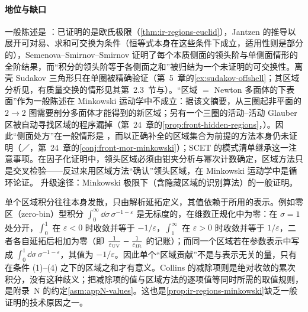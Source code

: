 \paragraph{地位与缺口}
一般陈述是 \tagP：已证明的是欧氏极限（\cref{thm:ir-regions-euclid}），Jantzen 的推导以展开可对易、求和可交换为条件（恒等式本身在这些条件下成立，适用性则是部分的）\cite{Jantzen2011}，Semenova--Smirnov--Smirnov 证明了每个本质侧面的领头阶与单侧面情形的全阶结果\cite{Semenova:2018cwy}，而“积分的领头阶等于各侧面之和”被归结为一个未证明的可交换性。离壳 Sudakov 三角形只在单圈被精确验证（第~5~章的\cref{ex:sudakov-offshell}；其区域分析见\cite[第~2.2~节]{BecherBroggioFerroglia2015}，有质量交换的情形见其第~2.3~节与\cite[第~6~节]{Jantzen2011}）。“区域 $=$ Newton 多面体的下表面”作为一般陈述在 Minkowski 运动学中不成立：据该文摘要，从三圈起非平面的 $2\to2$ 图需要剖分多面体才能得到的新区域\cite{Gardi:2024axt}；另有一个三圈的活动--活动 Glauber 区被自动寻找区域的程序漏掉\cite{Becher:2024kmk}（第~24~章的\cref{prop:front-hidden-regions}，\tagV）。因此“侧面处方”在一般情形是 \tagV，而以正确补全的区域集合为前提的方法本身仍未证明（\tagP／\tagC，第~24~章的\cref{conj:front-mor-minkowski}）；SCET 的模式清单继承这一注意事项。在因子化证明中，领头区域必须由钳夹分析与幂次计数确定，区域方法只是交叉检验——反过来用区域方法“确认”领头区域，在 Minkowski 运动学中是循环论证。%
升级途径：Minkowski 极限下（含隐藏区域的识别算法）的一般证明。

\begin{remark}[发散区域积分的值依赖于表示]\label{rem:ir-regions-values}
单个区域积分往往本身发散，只由解析延拓定义，其值依赖于所用的表示。例如零区（zero-bin）型积分 $\int_0^\infty\dd\sigma\,\sigma^{-1-\varepsilon}$ 是无标度的，在维数正规化中为零：在 $\sigma=1$ 处分开，$\int_0^1$ 在 $\varepsilon<0$ 时收敛并等于 $-1/\varepsilon$，$\int_1^\infty$ 在 $\varepsilon>0$ 时收敛并等于 $1/\varepsilon$，二者各自延拓后相加为零（即 $\frac1{\varepsilon_{\rm UV}}-\frac1{\varepsilon_{\rm IR}}$ 的记账）；而同一个区域若在参数表示中写成 $\int_0^1\dd\sigma\,\sigma^{-1-\varepsilon}$，其值为 $-1/\varepsilon$。因此单个“区域贡献”不是与表示无关的量，只有在条件 (1)--(4) 之下的区域之和才有意义。Collins 的减除项则是绝对收敛的累次积分，没有这种歧义；把减除项的值与区域方法的逐项值等同时所需的取值规则，是附录~N 的约定\cref{asm:appN-values}。这也是\cref{prop:ir-regions-minkowski}缺乏一般证明的技术原因之一。
\end{remark}

